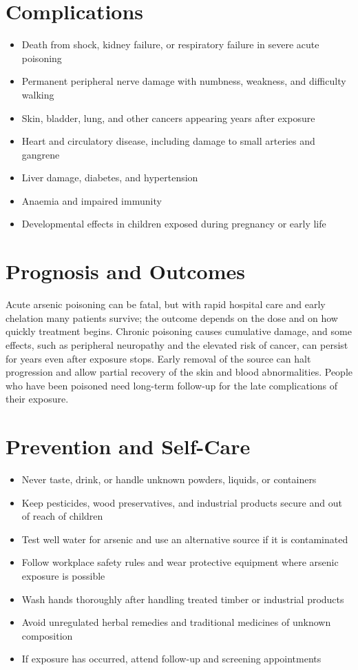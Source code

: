 \section*{Complications}
\begin{itemize}
    \item Death from shock, kidney failure, or respiratory failure in severe acute poisoning
    \item Permanent peripheral nerve damage with numbness, weakness, and difficulty walking
    \item Skin, bladder, lung, and other cancers appearing years after exposure
    \item Heart and circulatory disease, including damage to small arteries and gangrene
    \item Liver damage, diabetes, and hypertension
    \item Anaemia and impaired immunity
    \item Developmental effects in children exposed during pregnancy or early life
\end{itemize}

\section*{Prognosis and Outcomes}
Acute arsenic poisoning can be fatal, but with rapid hospital care and early chelation many patients survive; the outcome depends on the dose and on how quickly treatment begins. Chronic poisoning causes cumulative damage, and some effects, such as peripheral neuropathy and the elevated risk of cancer, can persist for years even after exposure stops. Early removal of the source can halt progression and allow partial recovery of the skin and blood abnormalities. People who have been poisoned need long-term follow-up for the late complications of their exposure.

\section*{Prevention and Self-Care}
\begin{itemize}
    \item Never taste, drink, or handle unknown powders, liquids, or containers
    \item Keep pesticides, wood preservatives, and industrial products secure and out of reach of children
    \item Test well water for arsenic and use an alternative source if it is contaminated
    \item Follow workplace safety rules and wear protective equipment where arsenic exposure is possible
    \item Wash hands thoroughly after handling treated timber or industrial products
    \item Avoid unregulated herbal remedies and traditional medicines of unknown composition
    \item If exposure has occurred, attend follow-up and screening appointments
\end{itemize}

